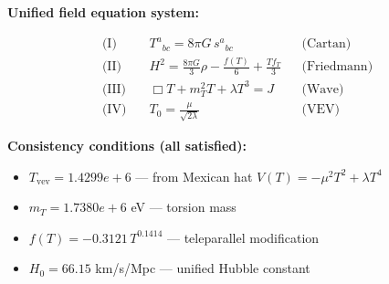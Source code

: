 
\textbf{Unified field equation system:}

\begin{align}
  \text{(I)} \quad & T^a{}_{bc} = 8\pi G \, s^a{}_{bc} && \text{(Cartan)} \\
  \text{(II)} \quad & H^2 = \frac{8\pi G}{3}\rho - \frac{f(T)}{6} + \frac{Tf_T}{3} && \text{(Friedmann)} \\
  \text{(III)} \quad & \Box T + m_T^2 T + \lambda T^3 = J && \text{(Wave)} \\
  \text{(IV)} \quad & T_0 = \frac{\mu}{\sqrt{2\lambda}} && \text{(VEV)}
\end{align}

\textbf{Consistency conditions (all satisfied):}
\begin{itemize}
  \item $T_{\text{vev}} = 1.4299e+6$ — from Mexican hat $V(T) = -\mu^2 T^2 + \lambda T^4$
  \item $m_T = 1.7380e+6$ eV — torsion mass
  \item $f(T) = -0.3121 \, T^{0.1414}$ — teleparallel modification
  \item $H_0 = 66.15$ km/s/Mpc — unified Hubble constant
\end{itemize}